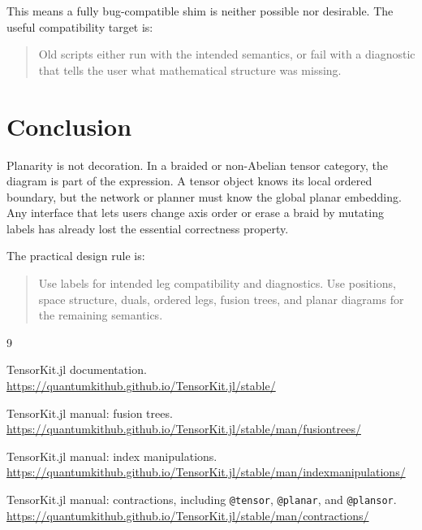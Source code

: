 \documentclass[11pt]{article}
\begin{document}
This means a fully bug-compatible shim is neither possible nor
desirable.  The useful compatibility target is:

\begin{quote}
Old scripts either run with the intended semantics, or fail with a
diagnostic that tells the user what mathematical structure was missing.
\end{quote}

\section{Conclusion}

Planarity is not decoration.  In a braided or non-Abelian tensor
category, the diagram is part of the expression.  A tensor object knows
its local ordered boundary, but the network or planner must know the
global planar embedding.  Any interface that lets users change axis
order or erase a braid by mutating labels has already lost the
essential correctness property.

The practical design rule is:

\begin{quote}
Use labels for intended leg compatibility and diagnostics.  Use
positions, space structure, duals, ordered legs, fusion trees, and
planar diagrams for the remaining semantics.
\end{quote}

\begin{thebibliography}{9}

TensorKit.jl documentation.
\newblock \url{https://quantumkithub.github.io/TensorKit.jl/stable/}

TensorKit.jl manual: fusion trees.
\newblock \url{https://quantumkithub.github.io/TensorKit.jl/stable/man/fusiontrees/}

TensorKit.jl manual: index manipulations.
\newblock \url{https://quantumkithub.github.io/TensorKit.jl/stable/man/indexmanipulations/}

TensorKit.jl manual: contractions, including \texttt{@tensor},
\texttt{@planar}, and \texttt{@plansor}.
\newblock \url{https://quantumkithub.github.io/TensorKit.jl/stable/man/contractions/}

\end{thebibliography}
\end{document}
